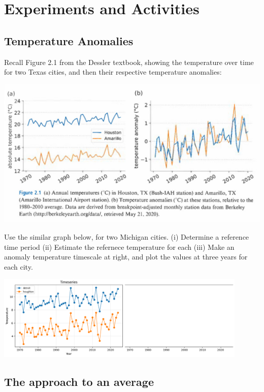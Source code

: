 \section{Experiments and Activities}


\subsection{Temperature Anomalies}

Recall Figure 2.1 from the Dessler textbook, showing the temperature over time for two Texas cities, and then their respective temperature anomalies:
%
\begin{center}
\includegraphics[width=\textwidth]{images/02_dessler_amarillo-vs-houston_fig2-1.jpg}
\end{center}
%
Use the similar graph below, for two Michigan cities.  (i) Determine a reference time period (ii) Estimate the refernece temperature for each (iii) Make an anomaly temperature timescale at right, and plot the values at three years for each city.
%
\begin{center}
\includegraphics[width=0.9\textwidth]{images/02_detroit-houghton_temperatures.png}
\end{center}
%


\subsection{The approach to an average}

